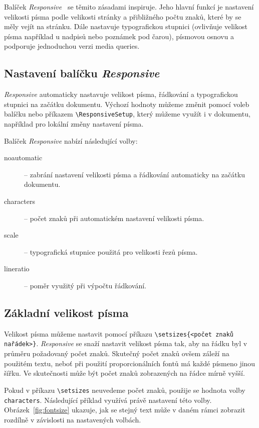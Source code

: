\documentclass{csbulletin}
\newcommand\balicek[1]{\textit{#1}}
\begin{document}
Balíček \balicek{Responsive}~\cite{responsive} se těmito zásadami inspiruje. 
Jeho hlavní funkcí je nastavení velikosti písma podle velikosti stránky
a přibližného počtu znaků, které by se měly vejít na stránku. 
Dále nastavuje typografickou stupnici (ovlivňuje velikost písma například 
u nadpisů nebo poznámek pod čarou), písmovou osnovu a podporuje
jednoduchou verzi media queries.

\subsection{Nastavení balíčku \balicek{Responsive}}

\balicek{Responsive} automaticky nastavuje velikost písma, řádkování 
a typografickou stupnici na začátku dokumentu. Výchozí hodnoty můžeme změnit
pomocí voleb balíčku nebo příkazem \verb|\ResponsiveSetup|, který můžeme 
využít i v dokumentu, například pro lokální změny nastavení písma. 

Balíček \balicek{Responsive} nabízí následující volby:

\begin{description}
  \item[noautomatic] – zabrání nastavení velikosti písma a řádkování automaticky na začátku dokumentu.
  \item[characters] – počet znaků při automatickém nastavení velikosti písma.
  \item[scale] –  typografická stupnice použitá pro velikosti řezů písma.
  \item[lineratio] – poměr využitý při výpočtu řádkování.
\end{description}

\subsection{Základní velikost písma}

Velikost písma můžeme nastavit pomocí příkazu \verb|\setsizes{<počet znaků na|\allowbreak\verb|řádek>}|. 
\balicek{Responsive} se snaží nastavit velikost písma tak, aby na řádku byl v průměru
požadovaný počet znaků. Skutečný počet znaků ovšem záleží na použitém textu, 
neboť při použití proporcionálních fontů má každé písmeno jinou šířku. 
Ve skutečnosti může být počet znaků zobrazených na řádce mírně vyšší.

Pokud v příkazu \verb|\setsizes| neuvedeme počet znaků, použije se hodnota volby \texttt{characters}.
Následující příklad využívá právě nastavení této volby. Obrázek~\ref{fig:fontsize} 
ukazuje, jak se stejný text může v daném rámci zobrazit rozdílně v závislosti na
nastavených volbách.
\end{document}
